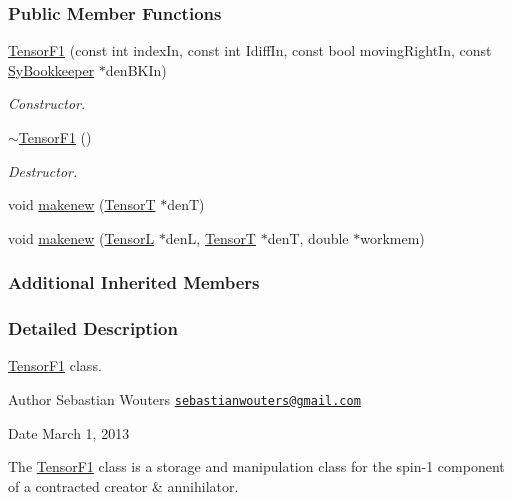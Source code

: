\subsubsection*{Public Member Functions}
\begin{DoxyCompactItemize}
\item 
\hyperlink{classCheMPS2_1_1TensorF1_adfde222e4c39d48f7dbd549eee300d12}{Tensor\-F1} (const int index\-In, const int Idiff\-In, const bool moving\-Right\-In, const \hyperlink{classCheMPS2_1_1SyBookkeeper}{Sy\-Bookkeeper} $\ast$den\-B\-K\-In)
\begin{DoxyCompactList}\small\item\em Constructor. \end{DoxyCompactList}\item 
\hypertarget{classCheMPS2_1_1TensorF1_a291d1188b6283eab3ded27547b02b29b}{\hyperlink{classCheMPS2_1_1TensorF1_a291d1188b6283eab3ded27547b02b29b}{$\sim$\-Tensor\-F1} ()}\label{classCheMPS2_1_1TensorF1_a291d1188b6283eab3ded27547b02b29b}

\begin{DoxyCompactList}\small\item\em Destructor. \end{DoxyCompactList}\item 
void \hyperlink{classCheMPS2_1_1TensorF1_af877d99d7863f3dd6764c85bc2704bc9}{makenew} (\hyperlink{classCheMPS2_1_1TensorT}{Tensor\-T} $\ast$den\-T)
\item 
void \hyperlink{classCheMPS2_1_1TensorF1_a68be6d1fe69d7bdeba915f621832ed91}{makenew} (\hyperlink{classCheMPS2_1_1TensorL}{Tensor\-L} $\ast$den\-L, \hyperlink{classCheMPS2_1_1TensorT}{Tensor\-T} $\ast$den\-T, double $\ast$workmem)
\end{DoxyCompactItemize}
\subsubsection*{Additional Inherited Members}


\subsubsection{Detailed Description}
\hyperlink{classCheMPS2_1_1TensorF1}{Tensor\-F1} class. \begin{DoxyAuthor}{Author}
Sebastian Wouters \href{mailto:sebastianwouters@gmail.com}{\tt sebastianwouters@gmail.\-com} 
\end{DoxyAuthor}
\begin{DoxyDate}{Date}
March 1, 2013
\end{DoxyDate}
The \hyperlink{classCheMPS2_1_1TensorF1}{Tensor\-F1} class is a storage and manipulation class for the spin-\/1 component of a contracted creator \& annihilator. 

